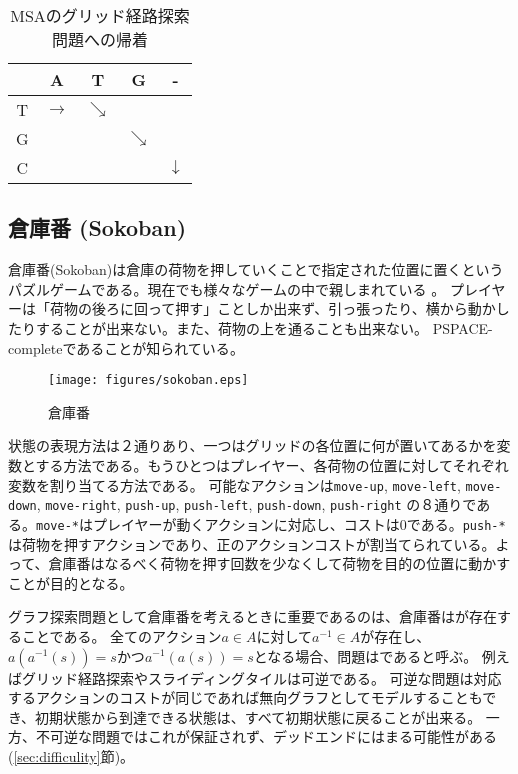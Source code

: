 \begin{table}
  \centering
\caption{MSAのグリッド経路探索問題への帰着}
\begin{tabular}{c|cccc}
  \toprule
	  & A & T & G & - \\ \midrule
	T & $\rightarrow$ & $\searrow$ &   &   \\
	G &   &   & $\searrow$ &   \\
	C &   &   &   & $\downarrow$ \\
        \bottomrule
\end{tabular}
\label{tbl:msa-to-grid}
\end{table}


\subsection{倉庫番 (Sokoban)}
倉庫番(Sokoban)は倉庫の荷物を押していくことで指定された位置に置くというパズルゲームである。現在でも様々なゲームの中で親しまれている \cite{junghanns1997sokoban,culberson:97}。
プレイヤーは「荷物の後ろに回って押す」ことしか出来ず、引っ張ったり、横から動かしたりすることが出来ない。また、荷物の上を通ることも出来ない。
PSPACE-completeであることが知られている\cite{culberson:97}。


\begin{figure}
\centering
\texttt{[image: figures/sokoban.eps]}
\caption{倉庫番}
\label{fig:sokoban}
\end{figure}

状態の表現方法は２通りあり、一つはグリッドの各位置に何が置いてあるかを変数とする方法である。もうひとつはプレイヤー、各荷物の位置に対してそれぞれ変数を割り当てる方法である。
可能なアクションは{\tt move-up}, {\tt move-left}, {\tt move-down}, {\tt move-right}, {\tt push-up}, {\tt push-left}, {\tt push-down}, {\tt push-right} の８通りである。{\tt move-*}はプレイヤーが動くアクションに対応し、コストは0である。{\tt push-*}は荷物を押すアクションであり、正のアクションコストが割当てられている。よって、倉庫番はなるべく荷物を押す回数を少なくして荷物を目的の位置に動かすことが目的となる。

グラフ探索問題として倉庫番を考えるときに重要であるのは、倉庫番はが存在することである。
全てのアクション$a \in A$に対して$a^{-1} \in A$が存在し、$a(a^{-1}(s)) = s$かつ$a^{-1}(a(s)) = s$となる場合、問題はであると呼ぶ。
例えばグリッド経路探索やスライディングタイルは可逆である。
可逆な問題は対応するアクションのコストが同じであれば無向グラフとしてモデルすることもでき、初期状態から到達できる状態は、すべて初期状態に戻ることが出来る。
一方、不可逆な問題ではこれが保証されず、デッドエンドにはまる可能性がある (\ref{sec:difficulity}節)。


